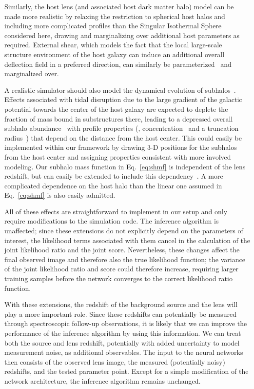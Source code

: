 \documentclass[twocolumn]{aastex62}
\begin{document}
Similarly, the host lens (and associated host dark matter halo) model can be made more realistic by relaxing the restriction to spherical host halos and including more complicated profiles than the Singular Isothermal Sphere considered here, drawing and marginalizing over additional host parameters as required. External shear, which models the fact that the local large-scale structure environment of the host galaxy can induce an additional overall deflection field in a preferred direction, can similarly be parameterized~\citep{1997MNRAS.292..673S,astro-ph/9610163} and marginalized over.

A realistic simulator should also model the dynamical evolution of subhalos~\citep{2017MNRAS.469.1997D}. Effects associated with tidal disruption due to the large gradient of the galactic potential towards the center of the host galaxy are expected to deplete the fraction of mass bound in substructures there, leading to a depressed overall subhalo abundance~\citep{2016MNRAS.457.1208H} with profile properties (\eg, concentration~\citep{1603.04057} and a truncation radius~\citep{0705.0682}) that depend on the distance from the host center. This could easily be implemented within our framework by drawing 3-D positions for the subhalos from the host center and assigning properties consistent with more involved modeling. Our subhalo mass function in Eq.~\eqref{eq:shmf} is independent of the lens redshift, but can easily be extended to include this dependency~\citep{2018PhRvD..97l3002H,2017MNRAS.469.1997D}. A more complicated dependence on the host halo than the linear one assumed in Eq.~\eqref{eq:shmf} is also easily admitted.

All of these effects are straightforward to implement in our setup and only require modifications to the simulation code. The inference algorithm is unaffected; since these extensions do not explicitly depend on the parameters of interest, the likelihood terms associated with them cancel in the calculation of the joint likelihood ratio and the joint score. Nevertheless, these changes affect the final observed image and therefore also the true likelihood function; the variance of the joint likelihood ratio and score could therefore increase, requiring larger training samples before the network converges to the correct likelihood ratio function.

With these extensions, the redshift of the background source and the lens will play a more important role. Since these redshifts can potentially be measured through spectroscopic follow-up observations, it is likely that we can improve the performance of the inference algorithm by using this information. We can treat both the source and lens redshift, potentially with added uncertainty to model measurement noise, as additional observables. The input to the neural networks then consists of the observed lens image, the measured (potentially noisy) redshifts, and the tested parameter point. Except for a simple modification of the network architecture, the inference algorithm remains unchanged.
\end{document}
